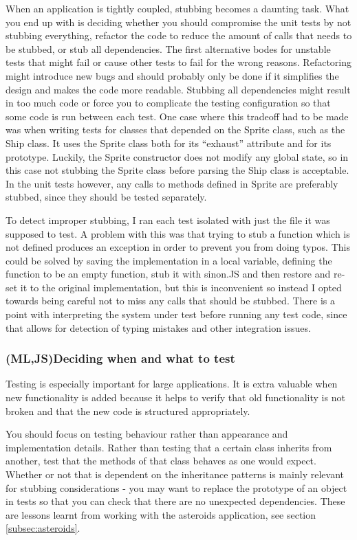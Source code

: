 \documentclass[11pt]{article}
\begin{document}
When an application is tightly coupled, stubbing becomes a daunting task. What you end up with is deciding whether you should compromise the unit tests by not stubbing everything, refactor the code to reduce the amount of calls that needs to be stubbed, or stub all dependencies. The first alternative bodes for unstable tests that might fail or cause other tests to fail for the wrong reasons. Refactoring might introduce new bugs and should probably only be done if it simplifies the design and makes the code more readable. Stubbing all dependencies might result in too much code or force you to complicate the testing configuration so that some code is run between each test. One case where this tradeoff had to be made was when writing tests for classes that depended on the Sprite class, such as the Ship class. It uses the Sprite class both for its ``exhaust'' attribute and for its prototype. Luckily, the Sprite constructor does not modify any global state, so in this case not stubbing the Sprite class before parsing the Ship class is acceptable. In the unit tests however, any calls to methods defined in Sprite are preferably stubbed, since they should be tested separately.

To detect improper stubbing, I ran each test isolated with just the file it was supposed to test. A problem with this was that trying to stub a function which is not defined produces an exception in order to prevent you from doing typos. This could be solved by saving the implementation in a local variable, defining the function to be an empty function, stub it with sinon.JS and then restore and re-set it to the original implementation, but this is inconvenient so instead I opted towards being careful not to miss any calls that should be stubbed. There is a point with interpreting the system under test before running any test code, since that allows for detection of typing mistakes and other integration issues.

\subsubsection{(ML,JS)Deciding when and what to test}

Testing is especially important for large applications. It is extra valuable when new functionality is added because it helps to verify that old functionality is not broken and that the new code is structured appropriately. \cite[questions~6-7]{Stenmark}

You should focus on testing behaviour rather than appearance and implementation details. \cite[question~10]{Edelstam} Rather than testing that a certain class inherits from another, test that the methods of that class behaves as one would expect. Whether or not that is dependent on the inheritance patterns is mainly relevant for stubbing considerations - you may want to replace the prototype of an object in tests so that you can check that there are no unexpected dependencies. These are lessons learnt from working with the asteroids application, see section \ref{subsec:asteroids}. 
\end{document}
